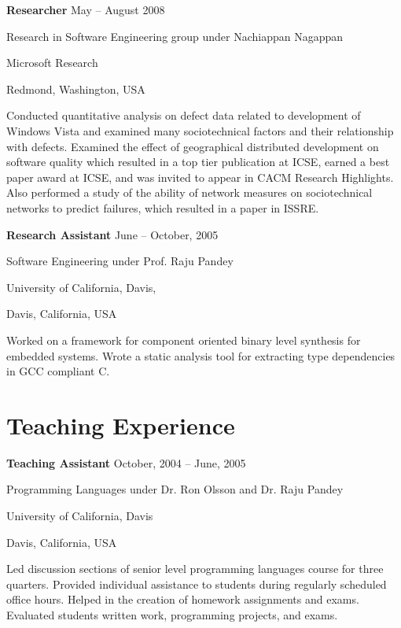 \documentclass[margin,line,article,letterpaper]{res}
\newenvironment{list1}{
  \begin{list}{}{%
      \setlength{\itemsep}{0in}
      \setlength{\parsep}{0in} \setlength{\parskip}{0in}
      \setlength{\topsep}{0in} \setlength{\partopsep}{0in} 
      \setlength{\leftmargin}{0.17in}}}{\end{list}}
\newcommand{\timespan}[1]{#1}
\begin{document}
\begin{resume}
\textbf{Researcher} \hfill \timespan{May -- August 2008}\\
\vspace{-10pt}
\begin{list1}
\item Research in Software Engineering group under Nachiappan Nagappan
\item Microsoft Research
\item Redmond, Washington, USA
\vspace{6pt}
\item Conducted quantitative analysis on defect data related to development of Windows 
Vista and examined many sociotechnical factors and their relationship with defects. 
Examined the effect of geographical distributed development on software quality which 
resulted in a top tier publication at ICSE, earned a best paper award at ICSE,
and was invited to appear in CACM Research Highlights.  Also performed a study
of the ability of network measures on sociotechnical networks to predict failures,
which resulted in a paper in ISSRE.
\end{list1}

\textbf{Research Assistant} \hfill \timespan{June -- October, 2005}\\
\vspace{-10pt}
\begin{list1}
\item Software Engineering under Prof. Raju Pandey
\item University of California, Davis,
\item Davis, California, USA
\vspace{6pt}
\item Worked on a framework for component oriented binary level synthesis for embedded 
systems. Wrote a static analysis tool for extracting type dependencies in GCC compliant 
C. 
\end{list1}

\section{Teaching Experience}
\textbf{Teaching Assistant} \hfill \timespan{October, 2004 -- June, 2005}\\
\vspace{-10pt}
\begin{list1}
\item Programming Languages under Dr. Ron Olsson and Dr. Raju Pandey
\item University of California, Davis
\item Davis, California, USA
\vspace{6pt}
\item Led discussion sections of senior level programming languages course for three quarters.
Provided individual assistance to students during regularly scheduled office hours. 
Helped in the creation of homework assignments and exams. Evaluated students written 
work, programming projects, and exams. 
\end{list1}


\end{resume}
\end{document}
